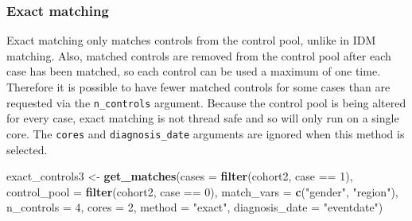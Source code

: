 \documentclass[]{article}
\newenvironment{Shaded}{\begin{snugshade}}{\end{snugshade}}
\newcommand{\KeywordTok}[1]{\textcolor[rgb]{0.13,0.29,0.53}{\textbf{{#1}}}}
\newcommand{\DataTypeTok}[1]{\textcolor[rgb]{0.13,0.29,0.53}{{#1}}}
\newcommand{\DecValTok}[1]{\textcolor[rgb]{0.00,0.00,0.81}{{#1}}}
\newcommand{\StringTok}[1]{\textcolor[rgb]{0.31,0.60,0.02}{{#1}}}
\newcommand{\NormalTok}[1]{{#1}}
\begin{document}
\begin{Shaded}
\end{Shaded}

\subsubsection{Exact matching}\label{exact-matching}

Exact matching only matches controls from the control pool, unlike in
IDM matching. Also, matched controls are removed from the control pool
after each case has been matched, so each control can be used a maximum
of one time. Therefore it is possible to have fewer matched controls for
some cases than are requested via the \texttt{n\_controls} argument.
Because the control pool is being altered for every case, exact matching
is not thread safe and so will only run on a single core. The
\texttt{cores} and \texttt{diagnosis\_date} arguments are ignored when
this method is selected.

\begin{Shaded}
\begin{Highlighting}[]
\NormalTok{exact_controls3 <-}\StringTok{ }\KeywordTok{get_matches}\NormalTok{(}\DataTypeTok{cases =} \KeywordTok{filter}\NormalTok{(cohort2, case ==}\StringTok{ }\DecValTok{1}\NormalTok{), }
                            \DataTypeTok{control_pool =} \KeywordTok{filter}\NormalTok{(cohort2, case ==}\StringTok{ }\DecValTok{0}\NormalTok{), }
                            \DataTypeTok{match_vars =} \KeywordTok{c}\NormalTok{(}\StringTok{"gender"}\NormalTok{, }\StringTok{"region"}\NormalTok{),}
                            \DataTypeTok{n_controls =} \DecValTok{4}\NormalTok{, }\DataTypeTok{cores =} \DecValTok{2}\NormalTok{, }
                            \DataTypeTok{method =} \StringTok{"exact"}\NormalTok{, }\DataTypeTok{diagnosis_date  =} \StringTok{"eventdate"}\NormalTok{)}
\end{Highlighting}
\end{Shaded}
\end{document}
